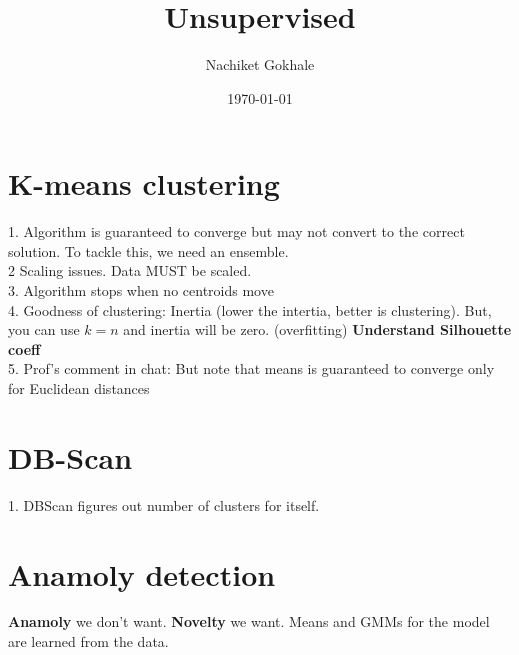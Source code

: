 \documentclass{article}
\begin{document}
\title{Unsupervised}
\author{Nachiket Gokhale}
\date{\today}
\maketitle
\section{K-means clustering}
1. Algorithm is guaranteed to converge but may not convert to the correct solution. To tackle this, we need an ensemble.\\
2 Scaling issues. Data MUST be scaled.\\
3. Algorithm stops when no centroids move\\
4. Goodness of clustering: Inertia (lower the intertia, better is clustering). But, you can use $k=n$ and inertia will be zero. (overfitting) \textbf{Understand Silhouette coeff}\\
5. Prof's comment in chat: But note that means is guaranteed to converge only for Euclidean distances

\section{DB-Scan}
1. DBScan figures out number of clusters for itself.


\section{Anamoly detection}
\textbf{Anamoly} we don't want. \textbf{Novelty} we want. Means and GMMs for the model are learned from the data.
\end{document}
